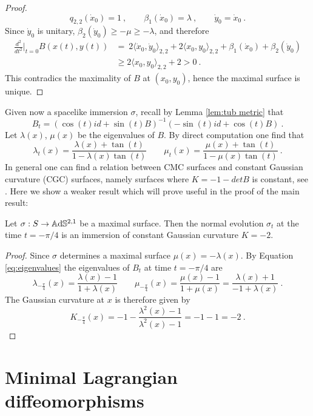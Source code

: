 \begin{proof}
    \[
        q_{2,2}(\dot{x}_0) = 1 \ , \qquad \beta_1(\dot{x}_0)= \lambda \ , \qquad \dot{y}_0=\dot{x}_0 \ .
    \] 
    Since $\dot{y}_0$ is unitary, $\beta_2(\dot{y}_0) \geq - \mu \geq -\lambda$, and therefore
    \[
    \begin{split}
        \frac{d^2}{dt^2}\Big|_{t=0} B(x(t),y(t)) & = \ 2\langle \dot{x}_0, \dot{y}_0 \rangle_{2,2} + 2\langle x_0, y_0 \rangle_{2,2} + \beta_1(\dot{x}_0) + \beta_2(\dot{y}_0) \\
        & \geq 2\langle x_0, y_0 \rangle_{2,2} + 2 > 0 \ .
    \end{split}
    \]
    This contradics the maximality of $B$ at $(x_0,y_0)$, hence the maximal surface is unique.
\end{proof}
Given now a spacelike immersion $\sigma$, recall by Lemma \ref{lem:tub metric} that
\[
    B_t = (\cos(t) id + \sin(t) B)^{-1}(-\sin(t) id + \cos(t) B) \ .
\]
Let $\lambda(x)$, $\mu(x)$ be the eigenvalues of $B$. By direct computation one find that
\begin{equation} \label{eq:eigenvalues}
    \lambda_t(x) = \frac{\lambda(x)+\tan(t)}{1- \lambda(x)\tan(t)} \qquad \mu_t(x) = \frac{\mu(x)+\tan(t)}{1- \mu(x)\tan(t)} \ .
\end{equation}
In general one can find a relation between CMC surfaces and constant Gaussian curvature (CGC) surfaces, namely surfaces where $K = -1 - detB$ is constant, see \cite{chen2017constantmeancurvaturefoliation}. Here we show a weaker result which will prove useful in the proof of the main result:
\begin{proposition} \label{prop:cmc to cgc}
    Let $\sigma: S \to\mathbb{A}\mathrm{d}\mathbb{S}^{2,1}$ be a maximal surface. Then the normal evolution $\sigma_{t}$ at the time $t= -\pi / 4$ is an immersion of constant Gaussian curvature $K = -2$.
\end{proposition}
\begin{proof}
    Since $\sigma$ determines a maximal surface $\mu(x) = - \lambda(x)$. By Equation \ref{eq:eigenvalues} the eigenvalues of $B_t$ at time $t=-\pi / 4$ are
    \[
        \lambda_{-\frac{\pi}{4}}(x) = \frac{\lambda(x) -1}{1 +\lambda(x)} \qquad \mu_{-\frac{\pi}{4}}(x) = \frac{\mu(x)-1}{1 + \mu(x)} = \frac{\lambda(x) + 1}{-1 + \lambda(x)} \ .
    \]
    The Gaussian curvature at $x$ is therefore given by
    \[
        K_{-\frac{\pi}{4}}(x) = - 1 - \frac{ \lambda^2(x) -1}{ \lambda^2(x) -1 } = -1 -1 = -2 \ .
    \]
\end{proof}

\section{Minimal Lagrangian diffeomorphisms}

